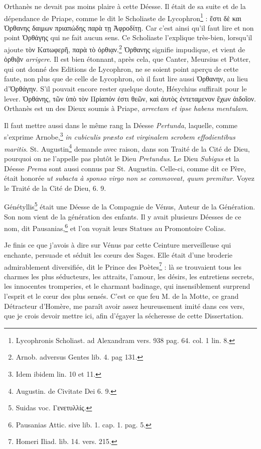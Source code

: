 \documentclass[a4paper, 18pt, oneside]{article}
\begin{document}
Orthanès ne devait pas moins plaire à cette Déesse. Il était de sa suite et de la dépendance de Priape, comme le dit le Scholiaste de Lycophron\footnote{Lycophronis Scholiast. ad Alexandram vers. 938 pag. 64. col. 1 lin. 8.} : ἔστι δὲ και Ὀρθανης δαιμων πριαπώδης παρὰ τῃ Ἀφροδίτῃ. Car c'est ainsi qu'il faut lire et non point Ὀρθάγης qui ne fait aucun sens. Ce Scholiaste l'explique très-bien, lorsqu'il ajoute τὸν Κατωφερῆ, παρὰ τὸ ὀρθιᾳν.\footnote{Arnob. adversus Gentes lib. 4. pag 131.} Ὀρθανης signifie impudique, et vient de ὁρθιᾷν \emph{arrigere}. Il est bien étonnant, après cela, que Canter, Meursius et Potter, qui ont donné des Editions de Lycophron, ne se soient point aperçu de cette faute, non plus que de celle de Lycophron, où il faut lire aussi Ὀρθανην, au lieu d'Ὀρθάγην. S'il pouvait encore rester quelque doute, Hésychius suffirait pour le lever. Ὀρθάνης, τῶν ὑπὸ τὸν Πρίαπόν ἐστι θεῶν, καὶ ἀυτὸς ἐντεταμενον ἔχων ἀιδοῖον. Orthanès est un des Dieux soumis à Priape, \emph{arrectam et ipse habens mentulam}.

Il faut mettre aussi dans le même rang la Déesse \emph{Pertunda}, laquelle, comme s'exprime Arnobe,\footnote{Idem ibidem lin. 10 et 11.} \emph{in cubiculis præsto est virginalem scrobem effodientibus maritis}. St. Augustin\footnote{Augustin. de Civitate Dei 6. 9.} demande avec raison, dans son Traité de la Cité de Dieu, pourquoi on ne l'appelle pas plutôt le Dieu \emph{Pretundus}. Le Dieu \emph{Subigus} et la Déesse \emph{Prema} sont aussi connus par St. Augustin. Celle-ci, comme dit ce Père, était honorée \emph{ut subacta à sponso virgo non se commoveat, quum premitur}. Voyez le Traité de la Cité de Dieu, 6. 9.

Génétyllis\footnote{Suidas voc. Γενετυλλίς.} était une Déesse de la Compagnie de Vénus, Auteur de la Génération. Son nom vient de la génération des enfants. Il y avait plusieurs Déesses de ce nom, dit Pausanias,\footnote{Pausanias Attic. sive lib. 1. cap. 1. pag. 5.} et l'on voyait leurs Statues au Promontoire Colias.

Je finis ce que j'avois à dire sur Vénus par cette Ceinture merveilleuse qui enchante, persuade et séduit les cœurs des Sages. Elle était d'une broderie admirablement diversifiée, dit le Prince des Poètes\footnote{Homeri Iliad. lib. 14. vers. 215.} : là se trouvaient tous les charmes les plus séducteurs, les attraits, l'amour, les désirs, les entretiens secrets, les innocentes tromperies, et le charmant badinage, qui insensiblement surprend l'esprit et le cœur des plus sensés. C'est ce que feu M. de la Motte, ce grand Détracteur d'Homère, me paraît avoir assez heureusement imité dans ces vers, que je crois devoir mettre ici, afin d'égayer la sécheresse de cette Dissertation.
\end{document}
